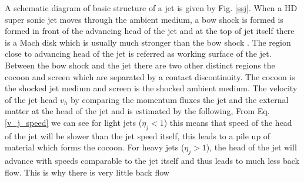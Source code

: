 \documentclass[12pt]{ociamthesis}
\newcommand{\eref}[1]{Eq. \eqref{#1}}
\newcommand{\fref}[1]{Fig. \eqref{#1}}
\begin{document}
\par A schematic diagram of basic structure of a jet is given by \fref{ssj}. When a HD super sonic jet moves through the ambient medium, a bow shock is formed is formed in front of the advancing head of the jet and at the top of jet itself there is a Mach disk which is usually much stronger than the bow shock \citep{Chakrabarti1988}. The region close to advancing head of the jet is referred as working surface of the jet. Between the bow shock and the jet there are two other distinct regions the cocoon and screen which are separated by a contact discontinuity. The cocoon is the shocked jet medium and screen is the shocked ambient medium. The velocity of the jet head $v_h$ by comparing the momentum fluxes the jet and the external matter at the head of the jet and is estimated by the following,
From \eref{v_j_speed} we can see for light jets ($\eta_j<1$) this means that speed of the head of the jet will be slower than the jet speed itself, this leads to a pile up of material which forms the cocoon. For heavy jets ($\eta_j>1$), the head of the jet will advance with speeds comparable to the jet itself and thus leads to much less back flow. This is why there is very little back flow 
\end{document}
